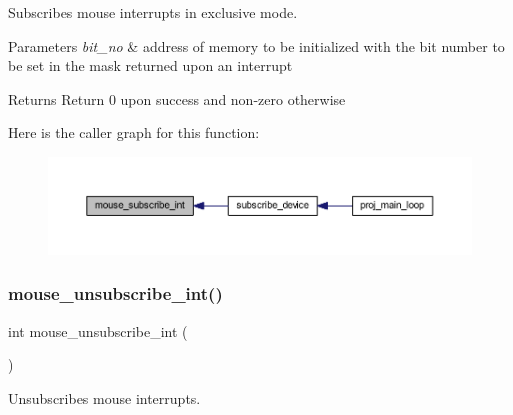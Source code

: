 Subscribes mouse interrupts in exclusive mode. 


\begin{DoxyParams}{Parameters}
{\em bit\+\_\+no} & address of memory to be initialized with the bit number to be set in the mask returned upon an interrupt \\
\hline
\end{DoxyParams}
\begin{DoxyReturn}{Returns}
Return 0 upon success and non-\/zero otherwise 
\end{DoxyReturn}
Here is the caller graph for this function\+:\nopagebreak
\begin{figure}[H]
\begin{center}
\leavevmode
\includegraphics[width=350pt]{group__mouse_ga9da18257ff113b686bb826d154bfaa87_icgraph}
\end{center}
\end{figure}
\mbox{\label{group__mouse_ga685ad2706aca36d9869a30a19b9f446a}} 
\subsubsection{\texorpdfstring{mouse\+\_\+unsubscribe\+\_\+int()}{mouse\_unsubscribe\_int()}}
{\footnotesize\ttfamily int mouse\+\_\+unsubscribe\+\_\+int (\begin{DoxyParamCaption}{ }\end{DoxyParamCaption})}



Unsubscribes mouse interrupts. 

